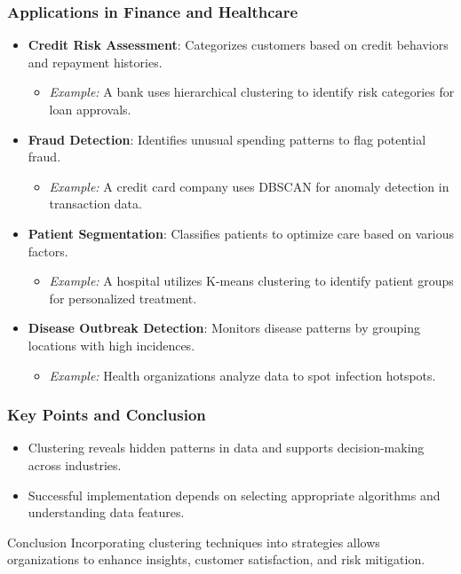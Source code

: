 \documentclass[aspectratio=169]{beamer}
\begin{document}
\begin{frame}[fragile]
    \frametitle{Applications in Finance and Healthcare}
    \begin{itemize}
        \item \textbf{Credit Risk Assessment}: Categorizes customers based on credit behaviors and repayment histories.
        \begin{itemize}
            \item \textit{Example:} A bank uses hierarchical clustering to identify risk categories for loan approvals.
        \end{itemize}
        \item \textbf{Fraud Detection}: Identifies unusual spending patterns to flag potential fraud.
        \begin{itemize}
            \item \textit{Example:} A credit card company uses DBSCAN for anomaly detection in transaction data.
        \end{itemize}
        \item \textbf{Patient Segmentation}: Classifies patients to optimize care based on various factors.
        \begin{itemize}
            \item \textit{Example:} A hospital utilizes K-means clustering to identify patient groups for personalized treatment.
        \end{itemize}
        \item \textbf{Disease Outbreak Detection}: Monitors disease patterns by grouping locations with high incidences.
        \begin{itemize}
            \item \textit{Example:} Health organizations analyze data to spot infection hotspots.
        \end{itemize}
    \end{itemize}
\end{frame}

\begin{frame}[fragile]
    \frametitle{Key Points and Conclusion}
    \begin{itemize}
        \item Clustering reveals hidden patterns in data and supports decision-making across industries.
        \item Successful implementation depends on selecting appropriate algorithms and understanding data features.
    \end{itemize}
    \begin{block}{Conclusion}
        Incorporating clustering techniques into strategies allows organizations to enhance insights, customer satisfaction, and risk mitigation.
    \end{block}
\end{frame}
\end{document}

